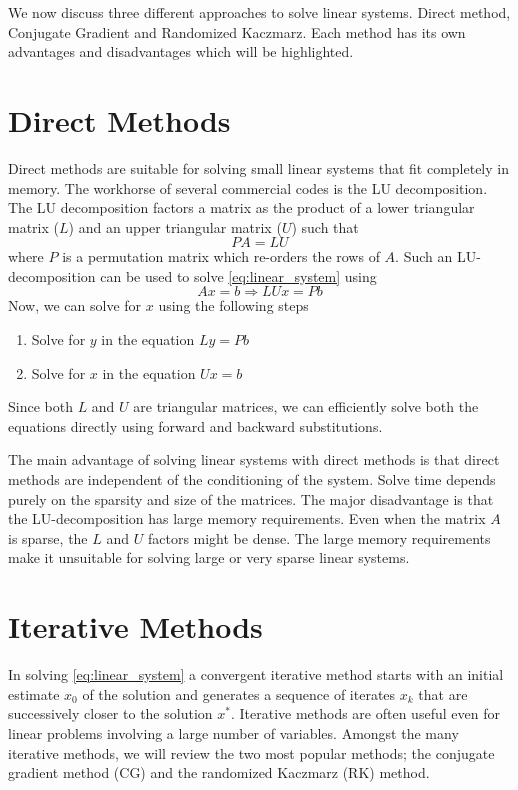 We now discuss three different approaches to solve linear systems. Direct method, 
Conjugate Gradient and Randomized Kaczmarz. Each method has its own advantages
and disadvantages which will be highlighted.

\section{Direct Methods}
Direct methods are suitable for solving small linear systems that fit completely
in memory. The workhorse of several commercial codes is the LU decomposition. 
The LU decomposition factors a matrix as the product of a lower triangular matrix 
($L$) and an upper triangular matrix ($U$) such that
$$
PA = LU
$$
where $P$ is a permutation matrix which re-orders the rows of $A$. Such an 
LU-decomposition can be used to solve \eqref{eq:linear_system} using
$$
  Ax = b \Rightarrow LUx = Pb 
$$
Now, we can solve for $x$ using the following steps
\begin{enumerate}
  \item Solve for $y$ in the equation $Ly = Pb$
  \item Solve for $x$ in the equation $Ux = b$
\end{enumerate}
Since both $L$ and $U$ are triangular matrices, we can efficiently solve both
the equations directly using forward and backward substitutions.

The main advantage of solving linear systems with direct methods is that direct
methods are independent of the conditioning of the system. Solve time depends
purely on the sparsity and size of the matrices. The major disadvantage is 
that the LU-decomposition has large memory requirements. Even when the matrix
$A$ is sparse, the $L$ and $U$ factors might be dense. The large memory
requirements make it unsuitable for solving large or very sparse linear 
systems.

\section{Iterative Methods}
In solving \eqref{eq:linear_system} a convergent iterative method starts
with an initial estimate $x_0$ of the solution and generates a sequence of iterates
$x_k$ that are successively closer to the solution $x^*$. Iterative methods 
are often useful even for linear problems involving a large number of variables.
Amongst the many iterative methods, we will review the two most popular methods;
the conjugate gradient method (CG) and the randomized Kaczmarz (RK) method.


